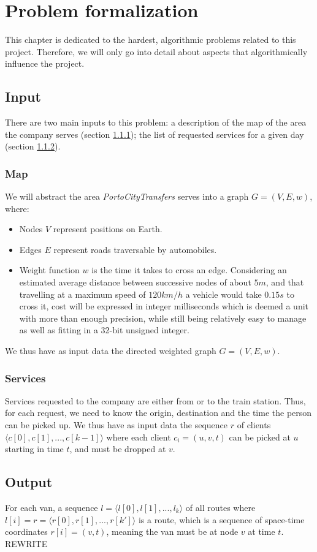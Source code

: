 \chapter{Problem formalization}
This chapter is dedicated to the hardest, algorithmic problems related to this project. Therefore, we will only go into detail about aspects that algorithmically influence the project.
\section{Input}
There are two main inputs to this problem: a description of the map of the area the company serves (section \ref{input-map}); the list of requested services for a given day (section \ref{input-services}).
\subsection{Map} \label{input-map}
We will abstract the area \emph{PortoCityTransfers} serves into a graph $G=(V,E, w)$, where:
\begin{itemize}
    \item Nodes $V$ represent positions on Earth.
    \item Edges $E$ represent roads traversable by automobiles.
    \item Weight function $w$ is the time it takes to cross an edge. Considering an estimated average distance between successive nodes of about $5 m$, and that travelling at a maximum speed of $120 km/h$ a vehicle would take $0.15 s$ to cross it, cost will be expressed in integer milliseconds which is deemed a unit with more than enough precision, while still being relatively easy to manage as well as fitting in a 32-bit unsigned integer.
\end{itemize}
We thus have as input data the directed weighted graph $G=(V,E,w)$.
\subsection{Services} \label{input-services}
Services requested to the company are either from or to the train station. Thus, for each request, we need to know the origin, destination and the time the person can be picked up.
We thus have as input data the sequence $r$ of clients $\langle c[0], c[1], ..., c[k-1] \rangle$ where each client $c_i=(u, v, t)$ can be picked at $u$ starting in time $t$, and must be dropped at $v$.
\section{Output}
For each van, a sequence $l=\langle l[0], l[1], ..., l_k \rangle$ of all routes where $l[i]=r=\langle r[0], r[1],..., r[k']\rangle$ is a route, which is a sequence of space-time coordinates $r[i]=(v, t)$, meaning the van must be at node $v$ at time $t$. REWRITE
